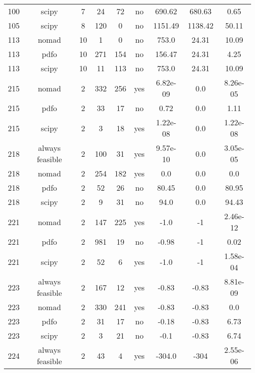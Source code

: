 \begin{footnotesize}
\begin{center}
\begin{longtable}{ccccccccc}
100 &           scipy &  7 &     24 &     72 &      no &      690.62 &      680.63 &     0.65\\
105 &           scipy &  8 &    120 &      0 &      no &     1151.49 &     1138.42 &    50.11\\
113 &           nomad & 10 &      1 &      0 &      no &       753.0 &       24.31 &    10.09\\
113 &            pdfo & 10 &    271 &    154 &      no &      156.47 &       24.31 &     4.25\\
113 &           scipy & 10 &     11 &    113 &      no &       753.0 &       24.31 &    10.09\\
215 &           nomad &  2 &    332 &    256 &     yes &    6.82e-09 &         0.0 & 8.26e-05\\
215 &            pdfo &  2 &     33 &     17 &      no &        0.72 &         0.0 &     1.11\\
215 &           scipy &  2 &      3 &     18 &     yes &    1.22e-08 &         0.0 & 1.22e-08\\
218 & always feasible &  2 &    100 &     31 &     yes &    9.57e-10 &         0.0 & 3.05e-05\\
218 &           nomad &  2 &    254 &    182 &     yes &         0.0 &         0.0 &      0.0\\
218 &            pdfo &  2 &     52 &     26 &      no &       80.45 &         0.0 &    80.95\\
218 &           scipy &  2 &      9 &     31 &      no &        94.0 &         0.0 &    94.43\\
221 &           nomad &  2 &    147 &    225 &     yes &        -1.0 &          -1 & 2.46e-12\\
221 &            pdfo &  2 &    981 &     19 &      no &       -0.98 &          -1 &     0.02\\
221 &           scipy &  2 &     52 &      6 &     yes &        -1.0 &          -1 & 1.58e-04\\
223 & always feasible &  2 &    167 &     12 &     yes &       -0.83 &       -0.83 & 8.81e-09\\
223 &           nomad &  2 &    330 &    241 &     yes &       -0.83 &       -0.83 &      0.0\\
223 &            pdfo &  2 &     31 &     17 &      no &       -0.18 &       -0.83 &     6.73\\
223 &           scipy &  2 &      3 &     21 &      no &        -0.1 &       -0.83 &     6.74\\
224 & always feasible &  2 &     43 &      4 &     yes &      -304.0 &        -304 & 2.55e-06\\

\end{longtable}
\end{center}
\end{footnotesize}
